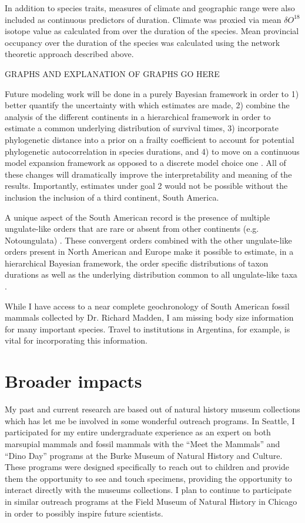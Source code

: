 \documentclass[11pt,letterpaper]{article}
\begin{document}
In addition to species traits, measures of climate and geographic range were also included as continuous predictors of duration. Climate was proxied via mean \(\delta O^{18}\) isotope value as calculated from \citet{Zachos2008} over the duration of the species. Mean provincial occupancy over the duration of the species was calculated using the network theoretic approach described above.

\uppercase{graphs and explanation of graphs go here}

Future modeling work will be done in a purely Bayesian framework in order to 1) better quantify the uncertainty with which estimates are made, 2) combine the analysis of the different continents in a hierarchical framework in order to estimate a common underlying distribution of survival times, 3) incorporate phylogenetic distance into a prior on a frailty coefficient \citep{Banerjee2003a,Ibrahim2001} to account for potential phylogenetic autocorrelation in species durations, and 4) to move on a continuous model expansion framework as opposed to a discrete model choice one \citep{Gelman2013d}. All of these changes will dramatically improve the interpretability and meaning of the results. Importantly, estimates under goal 2 would not be possible without the inclusion the inclusion of a third continent, South America. 

A unique aspect of the South American record is the presence of multiple ungulate-like orders that are rare or absent from other continents (e.g. Notoungulata) \citep{Marshall1982,Macfadden1997,Macfadden2006,Flynn1998a}. These convergent orders combined with the other ungulate-like orders present in North American and Europe make it possible to estimate, in a hierarchical Bayesian framework, the order specific distributions of taxon durations as well as the underlying distribution common to all ungulate-like taxa \citep{Gelman2013d}.

While I have access to a near complete geochronology of South American fossil mammals collected by Dr. Richard Madden, I am missing body size information for many important species. Travel to institutions in Argentina, for example, is vital for incorporating this information.


\section{Broader impacts}

My past and current research are based out of natural history museum collections which has let me be involved in some wonderful outreach programs. In Seattle, I participated for my entire undergraduate experience as an expert on both marsupial mammals and fossil mammals with the ``Meet the Mammals'' and ``Dino Day'' programs at the Burke Museum of Natural History and Culture. These programs were designed specifically to reach out to children and provide them the opportunity to see and touch specimens, providing the opportunity to interact directly with the museums collections. I plan to continue to participate in similar outreach programs at the Field Museum of Natural History in Chicago in order to possibly inspire future scientists. %
\end{document}
